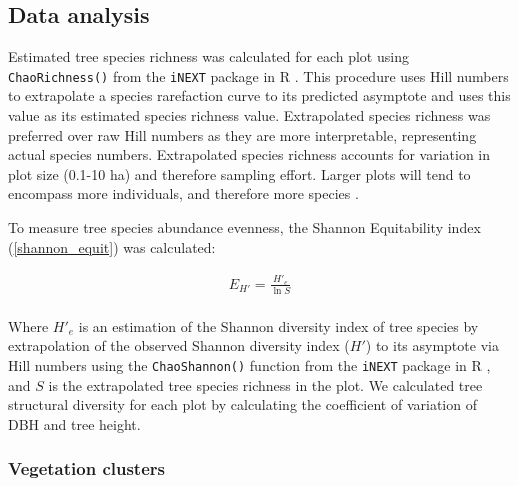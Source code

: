 \documentclass[11pt,a4paper]{article}
\begin{document}
% 
% 

\subsection{Data analysis}
Estimated tree species richness was calculated for each plot using \verb|ChaoRichness()| from the \verb|iNEXT| package in R \citep{Hsieh2016}. This procedure uses Hill numbers to extrapolate a species rarefaction curve to its predicted asymptote and uses this value as its estimated species richness value. Extrapolated species richness was preferred over raw Hill numbers as they are more interpretable, representing actual species numbers. Extrapolated species richness accounts for variation in plot size (0.1-10 ha) and therefore sampling effort. Larger plots will tend to encompass more individuals, and therefore more species \citep{Dengler2009}.

To measure tree species abundance evenness, the Shannon Equitability index \citep{Smith1996} (\autoref{shannon_equit}) was calculated: 

\begin{equation}
	\begin{gathered}
		E_{H'} = \frac{H'_{e}}{\ln{S}} \\
	\end{gathered}
	\label{shannon_equit}
\end{equation}

Where $H'_{e}$ is an estimation of the Shannon diversity index of tree species by extrapolation of the observed Shannon diversity index ($H'$) to its asymptote via Hill numbers using the \verb|ChaoShannon()| function from the \verb|iNEXT| package in R \citep{Hsieh2016}, and $S$ is the extrapolated tree species richness in the plot. We calculated tree structural diversity for each plot by calculating the coefficient of variation of DBH and tree height. 

\subsubsection{Vegetation clusters}
\end{document}
